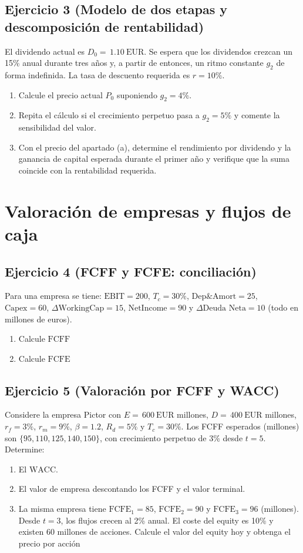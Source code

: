 \documentclass[12pt,a4paper]{article}
\newcommand{\EUR}[1]{\ensuremath{#1~\text{EUR}}}
\newenvironment{ejercicio}[1]{\subsection*{Ejercicio #1}}{}
\begin{document}
\begin{ejercicio}{3 (Modelo de dos etapas y descomposición de rentabilidad)}
El dividendo actual es $D_0=\,\EUR{1.10}$. Se espera que los dividendos crezcan un 15\% anual durante tres años y, a partir de entonces, un ritmo constante $g_2$ de forma indefinida. La tasa de descuento requerida es $r=10\%$.
\begin{enumerate}[label=\alph*)]
  \item Calcule el precio actual $P_0$ suponiendo $g_2=4\%$.
  \item Repita el cálculo si el crecimiento perpetuo pasa a $g_2=5\%$ y comente la sensibilidad del valor.
  \item Con el precio del apartado (a), determine el rendimiento por dividendo y la ganancia de capital esperada durante el primer año y verifique que la suma coincide con la rentabilidad requerida.
\end{enumerate}
\end{ejercicio}

\section{Valoración de empresas y flujos de caja}

\begin{ejercicio}{4 (FCFF y FCFE: conciliación)}
Para una empresa se tiene: $\text{EBIT}=200$, $T_c=30\%$, $\text{Dep\&Amort}=25$, $\text{Capex}=60$, $\Delta\text{WorkingCap}=15$, $\text{NetIncome}=90$ y $\Delta\text{Deuda Neta}=10$ (todo en millones de euros).
\begin{enumerate}[label=\alph*)]
  \item Calcule $\text{FCFF}$
  \item Calcule $\text{FCFE}$
\end{enumerate}
\end{ejercicio}

\begin{ejercicio}{5 (Valoración por FCFF y WACC)}
Considere la empresa Pictor con $E=\,\EUR{600}$ millones, $D=\,\EUR{400}$ millones, $r_f=3\%$, $r_m=9\%$, $\beta=1.2$, $R_d=5\%$ y $T_c=30\%$. Los FCFF esperados (millones) son $\{95,110,125,140,150\}$, con crecimiento perpetuo de $3\%$ desde $t=5$. Determine:
\begin{enumerate}[label=\alph*)]
  \item El $\text{WACC}$.
  \item El valor de empresa descontando los FCFF y el valor terminal.
  \item La misma empresa tiene $\text{FCFE}_1=85$, $\text{FCFE}_2=90$ y $\text{FCFE}_3=96$ (millones). Desde $t=3$, los flujos crecen al 2\% anual. El coste del equity es 10\% y existen 60 millones de acciones. Calcule el valor del equity hoy y obtenga el precio por acción
\end{enumerate}
\end{ejercicio}
\end{document}
